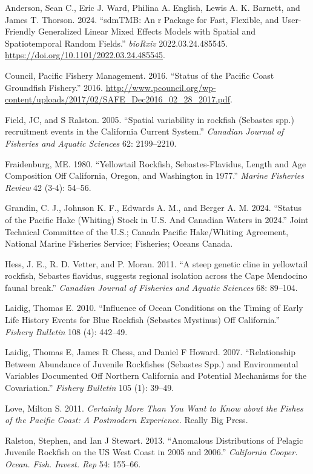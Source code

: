 \documentclass[
]{scrartcl}
\newlength{\cslhangindent}
\newenvironment{CSLReferences}[2] %
 {\begin{list}{}{%
  \setlength{\itemindent}{0pt}
  \setlength{\leftmargin}{0pt}
  \setlength{\parsep}{0pt}
  \ifodd #1
   \setlength{\leftmargin}{\cslhangindent}
   \setlength{\itemindent}{-1\cslhangindent}
  \fi
  \setlength{\itemsep}{#2\baselineskip}}}
 {\end{list}}
\begin{document}
\label{refs}
\begin{CSLReferences}{1}{0}
Anderson, Sean C., Eric J. Ward, Philina A. English, Lewis A. K.
Barnett, and James T. Thorson. 2024. {``sdmTMB: An r Package for Fast,
Flexible, and User-Friendly Generalized Linear Mixed Effects Models with
Spatial and Spatiotemporal Random Fields.''} \emph{bioRxiv}
2022.03.24.485545. \url{https://doi.org/10.1101/2022.03.24.485545}.

Council, Pacific Fishery Management. 2016. {``{Status of the Pacific
Coast Groundfish Fishery}.''} 2016.
\url{http://www.pcouncil.org/wp-content/uploads/2017/02/SAFE_Dec2016_02_28_2017.pdf}.

Field, JC, and S Ralston. 2005. {``{Spatial variability in rockfish
(Sebastes spp.) recruitment events in the California Current System}.''}
\emph{Canadian Journal of Fisheries and Aquatic Sciences} 62:
2199--2210.

Fraidenburg, ME. 1980. {``Yellowtail Rockfish, Sebastes-Flavidus, Length
and Age Composition Off California, Oregon, and Washington in 1977.''}
\emph{Marine Fisheries Review} 42 (3-4): 54--56.

Grandin, C. J., Johnson K. F., Edwards A. M., and Berger A. M. 2024.
{``Status of the {P}acific {H}ake (Whiting) Stock in {U}.{S}. And
{C}anadian Waters in 2024.''} Joint Technical Committee of the U.S.;
Canada Pacific Hake/Whiting Agreement, National Marine Fisheries
Service; Fisheries; Oceans Canada.

Hess, J. E., R. D. Vetter, and P. Moran. 2011. {``{A steep genetic cline
in yellowtail rockfish, Sebastes flavidus, suggests regional isolation
across the Cape Mendocino faunal break}.''} \emph{Canadian Journal of
Fisheries and Aquatic Sciences} 68: 89--104.

Laidig, Thomas E. 2010. {``Influence of Ocean Conditions on the Timing
of Early Life History Events for Blue Rockfish (Sebastes Mystinus) Off
California.''} \emph{Fishery Bulletin} 108 (4): 442--49.

Laidig, Thomas E, James R Chess, and Daniel F Howard. 2007.
{``Relationship Between Abundance of Juvenile Rockfishes (Sebastes Spp.)
and Environmental Variables Documented Off Northern California and
Potential Mechanisms for the Covariation.''} \emph{Fishery Bulletin} 105
(1): 39--49.

Love, Milton S. 2011. \emph{Certainly More Than You Want to Know about
the Fishes of the Pacific Coast: A Postmodern Experience}. Really Big
Press.

Ralston, Stephen, and Ian J Stewart. 2013. {``Anomalous Distributions of
Pelagic Juvenile Rockfish on the US West Coast in 2005 and 2006.''}
\emph{California Cooper. Ocean. Fish. Invest. Rep} 54: 155--66.

\end{CSLReferences}
\end{document}
